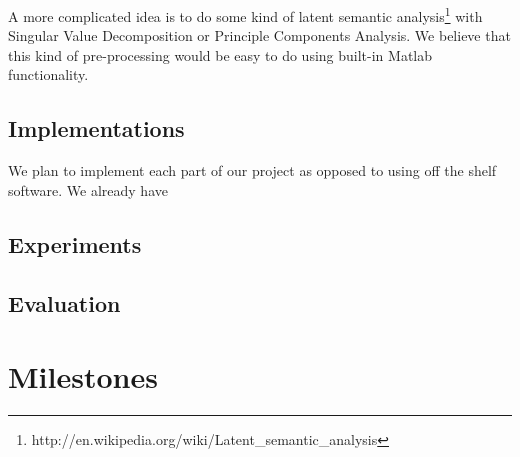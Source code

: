 \documentclass[10pt]{article}
\begin{document}
A more complicated idea is to do some kind of latent semantic analysis\footnote{http://en.wikipedia.org/wiki/Latent\_semantic\_analysis} with Singular Value Decomposition or Principle Components Analysis. We believe that this kind of pre-processing would be easy to do using built-in Matlab functionality.

\subsection{Implementations}
We plan to implement each part of our project as opposed to using off the shelf software. We already have 

\subsection{Experiments}

\subsection{Evaluation}


\section{Milestones}
\end{document}
